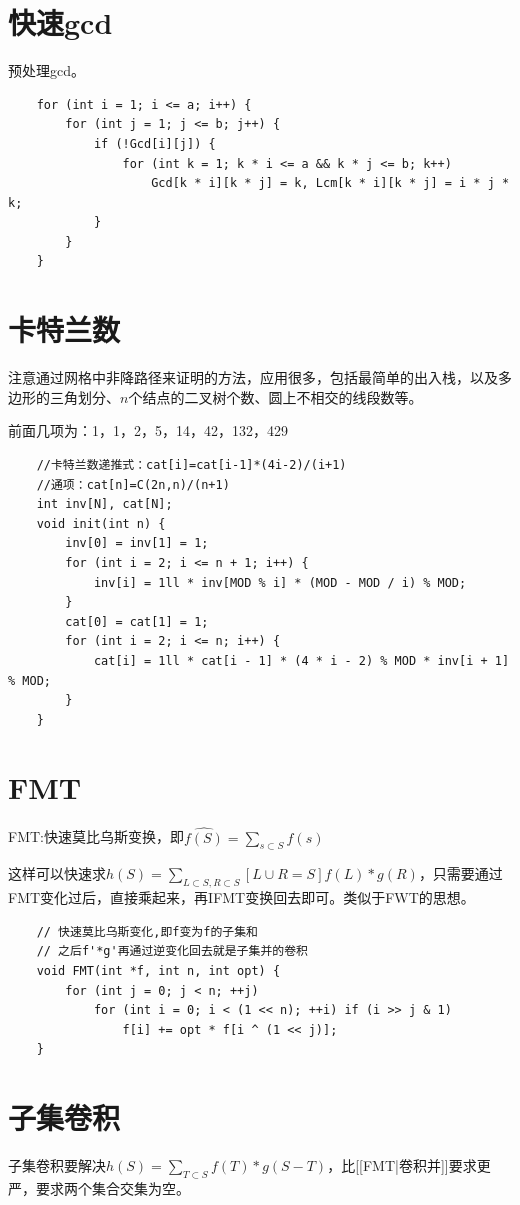 \documentclass[a4paper,11pt,twoside,fontset = fandol,UTF8]{ctexbook} %
\begin{document}
	\section{快速gcd}
	预处理gcd。
	\begin{lstlisting}
	for (int i = 1; i <= a; i++) {
	    for (int j = 1; j <= b; j++) {
	        if (!Gcd[i][j]) {
	            for (int k = 1; k * i <= a && k * j <= b; k++)
	                Gcd[k * i][k * j] = k, Lcm[k * i][k * j] = i * j * k;
	        }
	    }
	}
	\end{lstlisting}
	
	\section{卡特兰数}
	
	注意通过网格中非降路径来证明的方法，应用很多，包括最简单的出入栈，以及多边形的三角划分、$n$个结点的二叉树个数、圆上不相交的线段数等。
	
	前面几项为：1，1，2，5，14，42，132，429
	
	\begin{lstlisting}
	//卡特兰数递推式：cat[i]=cat[i-1]*(4i-2)/(i+1)
	//通项：cat[n]=C(2n,n)/(n+1) 
	int inv[N], cat[N];
	void init(int n) {
	    inv[0] = inv[1] = 1;
	    for (int i = 2; i <= n + 1; i++) {
	        inv[i] = 1ll * inv[MOD % i] * (MOD - MOD / i) % MOD;
	    }
	    cat[0] = cat[1] = 1;
	    for (int i = 2; i <= n; i++) {
	        cat[i] = 1ll * cat[i - 1] * (4 * i - 2) % MOD * inv[i + 1] % MOD;
	    }
	} 
	\end{lstlisting}
	
	\section{FMT}
	
	FMT:快速莫比乌斯变换，即$\displaystyle \hat{f(S)}=\sum_{s\subset S}f(s)$
	
	这样可以快速求$\displaystyle h(S)=\sum_{L\subset S,R\subset S}[L\cup R=S]f(L)*g(R)$，只需要通过FMT变化过后，直接乘起来，再IFMT变换回去即可。类似于FWT的思想。
	
	\begin{lstlisting}
	// 快速莫比乌斯变化,即f变为f的子集和
	// 之后f'*g'再通过逆变化回去就是子集并的卷积
	void FMT(int *f, int n, int opt) {
	    for (int j = 0; j < n; ++j)
	        for (int i = 0; i < (1 << n); ++i) if (i >> j & 1)
	            f[i] += opt * f[i ^ (1 << j)];
	}
	\end{lstlisting}
	
	\section{子集卷积}
	子集卷积要解决$\displaystyle h(S)=\sum_{T\subset S}f(T)*g(S-T)$，比[[FMT|卷积并]]要求更严，要求两个集合交集为空。
	
\end{document}
